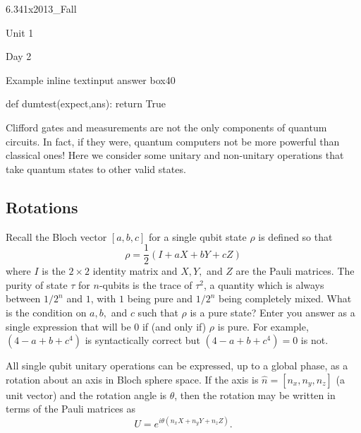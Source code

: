 \documentclass[12pt]{article}
\begin{document}
\begin{edXcourse}{6.341x}{2013_Fall}
\begin{edXchapter}{Unit 1}
\begin{edXsection}{Day 2}
\begin{edXproblem}{Example inline textinput answer box}{40}
\begin{edXscript}

def dumtest(expect,ans):
    return True

\end{edXscript}

Clifford gates and measurements are not the only components of quantum
circuits. In fact, if they were, quantum computers not be more
powerful than classical ones! Here we consider some unitary and
non-unitary operations that take quantum states to other valid states.

\subsection{Rotations}

Recall the Bloch vector $[a,b,c]$ for a single qubit state $\rho$ is defined so that 
\begin{equation}
\rho = \frac12(I+aX+bY+cZ)
\end{equation}
where $I$ is the $2\times2$ identity matrix and $X,Y,$ and $Z$ are the
Pauli matrices. The purity of state $\tau$ for $n$-qubits is the trace
of $\tau^2$, a quantity which is always between $1/2^n$ and $1$, with
$1$ being pure and $1/2^n$ being completely mixed. What is the
condition on $a,b,$ and $c$ such that $\rho$ is a pure state? Enter
you answer as a single expression that will be 0 if (and only if)
$\rho$ is pure. For example, $(4-a+b+c^4)$ is syntactically correct
but $(4-a+b+c^4)=0$ is not.


 

All single qubit unitary operations can be expressed, up to a global
phase, as a rotation about an axis in Bloch sphere space. If the axis
is $\hat n=[n_x,n_y,n_z]$ (a unit vector) and the rotation angle is
$\theta$, then the rotation may be written in terms of the Pauli
matrices as
\begin{equation}
U=e^{i\theta\left(n_x X+n_y Y+n_z Z\right)}.
\end{equation}

\end{edXproblem}


\end{edXsection}
\end{edXchapter}


\end{edXcourse}
\end{document}
